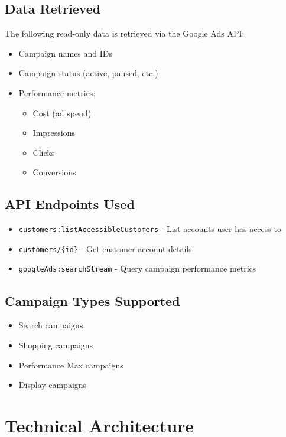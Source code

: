 \documentclass[11pt,a4paper]{article}
\begin{document}
\subsection{Data Retrieved}
The following read-only data is retrieved via the Google Ads API:

\begin{itemize}
    \item Campaign names and IDs
    \item Campaign status (active, paused, etc.)
    \item Performance metrics:
    \begin{itemize}
        \item Cost (ad spend)
        \item Impressions
        \item Clicks
        \item Conversions
    \end{itemize}
\end{itemize}

\subsection{API Endpoints Used}
\begin{itemize}
    \item \texttt{customers:listAccessibleCustomers} - List accounts user has access to
    \item \texttt{customers/\{id\}} - Get customer account details
    \item \texttt{googleAds:searchStream} - Query campaign performance metrics
\end{itemize}

\subsection{Campaign Types Supported}
\begin{itemize}
    \item Search campaigns
    \item Shopping campaigns
    \item Performance Max campaigns
    \item Display campaigns
\end{itemize}

\section{Technical Architecture}
\end{document}
